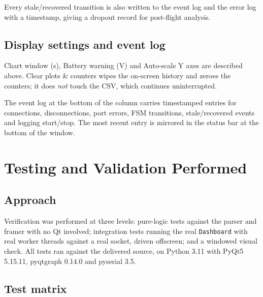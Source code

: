 \documentclass[11pt,a4paper]{article}
\newcommand{\code}[1]{\texttt{#1}}
\begin{document}
Every stale/recovered transition is also written to the event log and the
error log with a timestamp, giving a dropout record for post-flight analysis.

\subsection{Display settings and event log}

\textsf{Chart window (s)}, \textsf{Battery warning (V)} and
\textsf{Auto-scale Y axes} are described above. \textsf{Clear plots \&
counters} wipes the on-screen history and zeroes the counters; it does
\emph{not} touch the CSV, which continues uninterrupted.

The event log at the bottom of the column carries timestamped entries for
connections, disconnections, port errors, FSM transitions, stale/recovered
events and logging start/stop. The most recent entry is mirrored in the
status bar at the bottom of the window.

\section{Testing and Validation Performed}
\label{sec:testing}

\subsection{Approach}

Verification was performed at three levels: pure-logic tests against the
parser and framer with no Qt involved; integration tests running the real
\code{Dashboard} with real worker threads against a real socket, driven
offscreen; and a windowed visual check. All tests ran against the delivered
source, on Python 3.11 with PyQt5 5.15.11, pyqtgraph 0.14.0 and pyserial 3.5.

\subsection{Test matrix}
\end{document}
